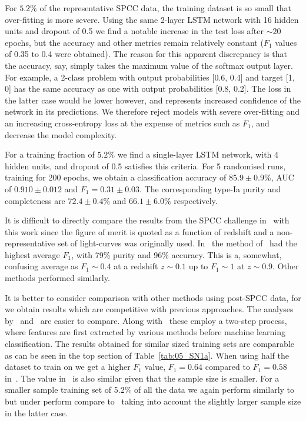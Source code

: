 \documentclass[twocolumn]{aastex61}
\begin{document}
For $5.2\%$ of the representative SPCC data, the training dataset is so small that over-fitting is more severe. Using the same 2-layer LSTM network with 16 hidden units and dropout of 0.5 we find a notable increase in the test loss after $\sim 20$ epochs, but the accuracy and other metrics remain relatively constant ($F_1$ values of 0.35 to 0.4 were obtained). The reason for this apparent discrepancy is that the accuracy, say, simply takes the maximum value of the softmax output layer. For example, a 2-class problem with output probabilities [0.6, 0.4] and target [1, 0] has the same accuracy as one with output probabilities [0.8, 0.2]. The loss in the latter case would be lower however, and represents increased confidence of the network in its predictions. We therefore reject models with severe over-fitting and an increasing cross-entropy loss at the expense of metrics such as $F_1$, and decrease the model complexity. 

For a training fraction of  $5.2\%$ we find a single-layer LSTM network, with 4 hidden units, and dropout of 0.5 satisfies this criteria. For 5 randomised runs, training for 200 epochs, we obtain a classification accuracy of $85.9 \pm 0.9$\%, AUC of $0.910 \pm 0.012$ and $F_1 = 0.31 \pm 0.03$. The corresponding type-Ia purity and completeness are $72.4\pm0.4\%$ and $66.1\pm6.0\%$ respectively.

It is difficult to directly compare the results from the SPCC challenge in~\cite{Kessler:2010qj} with this work since the figure of merit is quoted as a function of redshift and a non-representative set of light-curves was originally used. In~\cite{Kessler:2010qj} the method of~\cite{2008AJ....135..348S} had the highest average $F_1$, with 79\% purity and 96\% accuracy. This is a, somewhat, confusing average as $F_1\sim 0.4$ at a redshift $z\sim0.1$ up to $F_1\sim1$ at $z\sim0.9$. Other methods performed similarly. 

It is better to consider comparison with other methods using post-SPCC data, for we obtain results which are competitive with previous approaches. The analyses by~\cite{Karpenka:2012pm} and~\cite{Newling:2010bp} are easier to compare. Along with~\cite{Lochner:2016hbn} these employ a two-step process, where features are first extracted by various methods before machine learning classification. The results obtained for similar sized training sets are comparable as can be seen in the top section of Table~\ref{tab:05_SN1a}. When using half the dataset to train on we get a higher $F_1$ value, $F_1=0.64$ compared to $F_1=0.58$ in~\cite{Karpenka:2012pm}. The value in~\cite{Newling:2010bp} is also similar given that the sample size is smaller. For a smaller sample training set of 5.2\% of all the data we again perform similarly to~\cite{Karpenka:2012pm} but under perform compare to~\cite{Newling:2010bp} taking into account the slightly larger sample size in the latter case.
\end{document}
